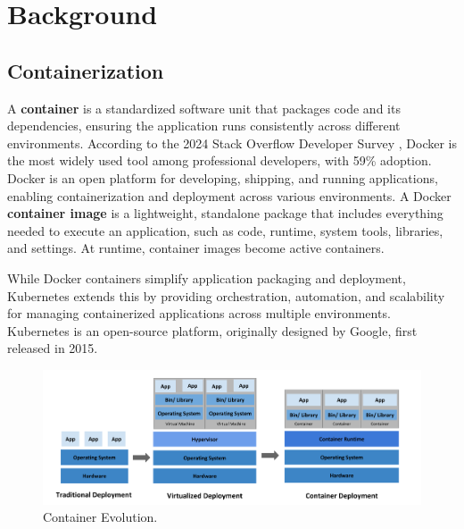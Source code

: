 \documentclass[../main.tex]{subfiles}
\begin{document}
\chapter{Background}

\section{Containerization} 

A \textbf{container} is a standardized software unit that packages code and its dependencies, ensuring the application runs consistently across different environments. According to the 2024 Stack Overflow Developer Survey \cite{surveystackoverflow}, Docker is the most widely used tool among professional developers, with 59\% adoption. Docker is an open platform for developing, shipping, and running applications, enabling containerization and deployment across various environments. A Docker \textbf{container image} is a lightweight, standalone package that includes everything needed to execute an application, such as code, runtime, system tools, libraries, and settings. At runtime, container images become active containers. \cite{container}

While Docker containers simplify application packaging and deployment, Kubernetes extends this by providing orchestration, automation, and scalability for managing containerized applications across multiple environments. Kubernetes is an open-source platform, originally designed by Google, first released in 2015.

\begin{figure}[H]
    \centering
    \includegraphics[scale=0.5]{img/3-background/kubernetes/container_evolution.png}
    \caption{Container Evolution. \protect\footnotemark}
    \label{fig:container_evolution}
\end{figure}

\end{document}
